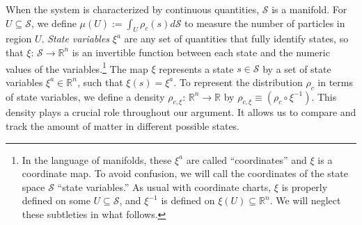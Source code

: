 \documentclass[12pt, twoside]{article}
\begin{document}


When the system is characterized by continuous quantities, $\mathcal{S}$ is a manifold. For $U \subseteq \mathcal{S}$, we define $\mu(U) := \int_U \rho_c(s) d\mathcal{S}$ to measure the number of particles in region $U$. \textit{State variables} $\xi^a$ are any set of quantities that fully identify states, so that $\xi$: $\mathcal{S} \to \mathbb{R}^n$ is an invertible function between each state and the numeric values of the variables.\footnote{In the language of manifolds, these $\xi^a$ are called ``coordinates'' and $\xi$ is a coordinate map. To avoid confusion, we will call the coordinates of the state space $\mathcal{S}$ ``state variables.'' As usual with coordinate charts, $\xi$ is properly defined on some $U \subseteq \mathcal{S}$, and $\xi^{-1}$ is defined on $\xi(U) \subseteq \mathbb{R}^n$. We will neglect these subtleties in what follows.} The map $\xi$ represents a state $s \in \mathcal{S}$ by a set of state variables $\xi^a \in \mathbb{R}^n$, such that $\xi (s) = \xi^a$. To represent the distribution $\rho_c$ in terms of state variables, we define a density $\rho_{c, \xi}$: $\mathbb{R}^n \to \mathbb{R}$ by $\rho_{c, \xi} \equiv (\rho_c \circ \xi^{-1})$. This density plays a crucial role throughout our argument. It allows us to compare and track the amount of matter in different possible states.
\end{document}
